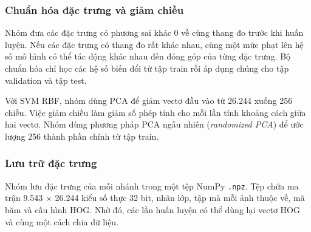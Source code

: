 \subsubsection{Chuẩn hóa đặc trưng và giảm chiều}

Nhóm đưa các đặc trưng có phương sai khác 0 về cùng thang đo trước khi huấn luyện. Nếu các đặc trưng có thang đo rất khác nhau, cùng một mức phạt lên hệ số mô hình có thể tác động khác nhau đến đóng góp của từng đặc trưng. Bộ chuẩn hóa chỉ học các hệ số biến đổi từ tập train rồi áp dụng chúng cho tập validation và tập test.

Với SVM RBF, nhóm dùng PCA để giảm vectơ đầu vào từ 26.244 xuống 256 chiều. Việc giảm chiều làm giảm số phép tính cho mỗi lần tính khoảng cách giữa hai vectơ. Nhóm dùng phương pháp PCA ngẫu nhiên (\emph{randomized PCA}) để ước lượng 256 thành phần chính từ tập train.

\subsubsection{Lưu trữ đặc trưng}

Nhóm lưu đặc trưng của mỗi nhánh trong một tệp NumPy \texttt{.npz}. Tệp chứa ma trận 9.543 $\times$ 26.244 kiểu số thực 32 bit, nhãn lớp, tập mà mỗi ảnh thuộc về, mã băm và cấu hình HOG. Nhờ đó, các lần huấn luyện có thể dùng lại vectơ HOG và cùng một cách chia dữ liệu.
